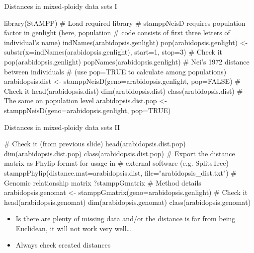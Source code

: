 \documentclass[compress, ucs, xelatex, 11pt, xcolor=svgnames,
  hyperref={
    bookmarks=true,
    unicode=true,
    colorlinks=true,
    pdftitle={Molecular data in R},
    plainpages=false,
    pdfauthor={Vojtech Zeisek},
    pdfsubject={Course about phylogeny and evolution in R},
    pdfcreator={XeLaTeX},
    pdfkeywords={R, evolution, phylogeny, molecular data},
    linkcolor=Tomato,
    anchorcolor=SaddleBrown,
    citecolor=Goldenrod,
    filecolor=DarkMagenta,
    menucolor=Sienna,
    urlcolor=DarkTurquoise,
    pdftex},
  url={hyphens, lowtilde} %
  ]{beamer}
\begin{document}
\begin{frame}[fragile]{Distances in mixed-ploidy data sets I}
  \begin{spluscode}
    library(StAMPP) # Load required library
    # stamppNeisD requires population factor in genlight (here, population
    # code consists of first three letters of individual's name)
    indNames(arabidopsis.genlight)
    pop(arabidopsis.genlight) <- substr(x=indNames(arabidopsis.genlight),
      start=1, stop=3)
    # Check it
    pop(arabidopsis.genlight)
    popNames(arabidopsis.genlight)
    # Nei's 1972 distance between individuals
    # (use pop=TRUE to calculate among populations)
    arabidopsis.dist <- stamppNeisD(geno=arabidopsis.genlight, pop=FALSE)
    # Check it
    head(arabidopsis.dist)
    dim(arabidopsis.dist)
    class(arabidopsis.dist)
    # The same on population level
    arabidopsis.dist.pop <- stamppNeisD(geno=arabidopsis.genlight, pop=TRUE)
  \end{spluscode}
\end{frame}

\begin{frame}[fragile]{Distances in mixed-ploidy data sets II}
  \begin{spluscode}
    # Check it (from previous slide)
    head(arabidopsis.dist.pop)
    dim(arabidopsis.dist.pop)
    class(arabidopsis.dist.pop)
    # Export the distance matrix as Phylip format for usage in
    # external software (e.g. SplitsTree)
    stamppPhylip(distance.mat=arabidopsis.dist, file="arabidopsis_dist.txt")
    # Genomic relationship matrix
    ?stamppGmatrix # Method details
    arabidopsis.genomat <- stamppGmatrix(geno=arabidopsis.genlight)
    # Check it
    head(arabidopsis.genomat)
    dim(arabidopsis.genomat)
    class(arabidopsis.genomat)
  \end{spluscode}
  \begin{itemize}
    \item Is there are plenty of missing data and/or the distance is far from being Euclidean, it will not work very well\ldots
    \item Always check created distances
  \end{itemize}
\end{frame}
\end{document}
